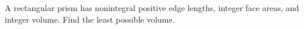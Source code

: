 A rectangular prism has nonintegral positive edge lengths, integer face areas, and integer volume. Find the least possible volume.
